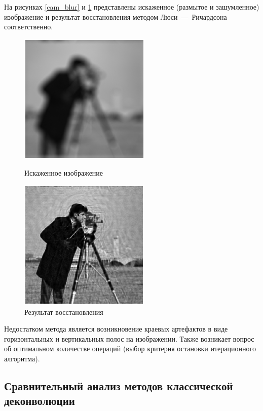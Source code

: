 На рисунках \ref{cam_blur} и \ref{cam_deblur} представлены искаженное (размытое и зашумленное) изображение и результат восстановления методом Люси~---~Ричардсона соответственно.

\begin{figure}[!htb]
	\begin{minipage}{0.48\textwidth}
		\centering
		\includegraphics[scale=1.2]{assets/cameramen_blurred}
		\caption{Искаженное изображение}\label{cam_blur}
	\end{minipage}\hfill
	\begin{minipage}{0.48\textwidth}
		\centering
		\includegraphics[scale=1.2]{assets/cameramen_deblurred}
		\caption{Результат восстановления}\label{cam_deblur}
	\end{minipage}
\end{figure}

Недостатком метода является возникновение краевых артефактов в виде горизонтальных и вертикальных полос на изображении. Также возникает вопрос об оптимальном количестве операций (выбор критерия остановки итерационного алгоритма).

\subsection{Сравнительный анализ методов классической деконволюции}

